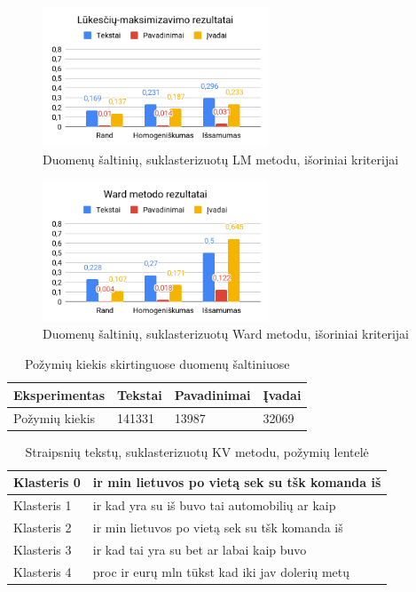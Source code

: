 \documentclass{VUMIFInfBakalaurinis}
\begin{document}
\begin{figure}[H]
	\centering
	\includegraphics[width=0.6\textwidth]{./img/image2.png}
  \caption{Duomenų šaltinių, suklasterizuotų LM metodu, išoriniai kriterijai}
\end{figure}

\begin{figure}[H]
	\centering
	\includegraphics[width=0.6\textwidth]{./img/image10.png}
  \caption{Duomenų šaltinių, suklasterizuotų Ward metodu, išoriniai kriterijai}
\end{figure}

\begin{table}[H]
  \centering
  \caption{Požymių kiekis skirtinguose duomenų šaltiniuose}
  \begin{tabular}{|l|l|l|l|}
  \hline
  Eksperimentas & Tekstai & Pavadinimai & Įvadai \\ \hline
  Požymių kiekis        & 141331  & 13987       & 32069  \\ \hline
  \end{tabular}
\end{table}

\begin{table}[H]
  \centering
  \caption{Straipsnių tekstų, suklasterizuotų KV metodu, požymių lentelė}
  \small
  \begin{tabular}{|l|l|}
  \hline
  Klasteris 0 & ir min lietuvos po vietą sek su tšk komanda iš  \\ \hline
  Klasteris 1 & ir kad yra su iš buvo tai automobilių ar kaip   \\ \hline
  Klasteris 2 & ir min lietuvos po vietą sek su tšk komanda iš  \\ \hline
  Klasteris 3 & ir kad tai yra su bet ar labai kaip buvo        \\ \hline
  Klasteris 4 & proc ir eurų mln tūkst kad iki jav dolerių metų \\ \hline
  \end{tabular}
  \normalsize
\end{table}
\end{document}
